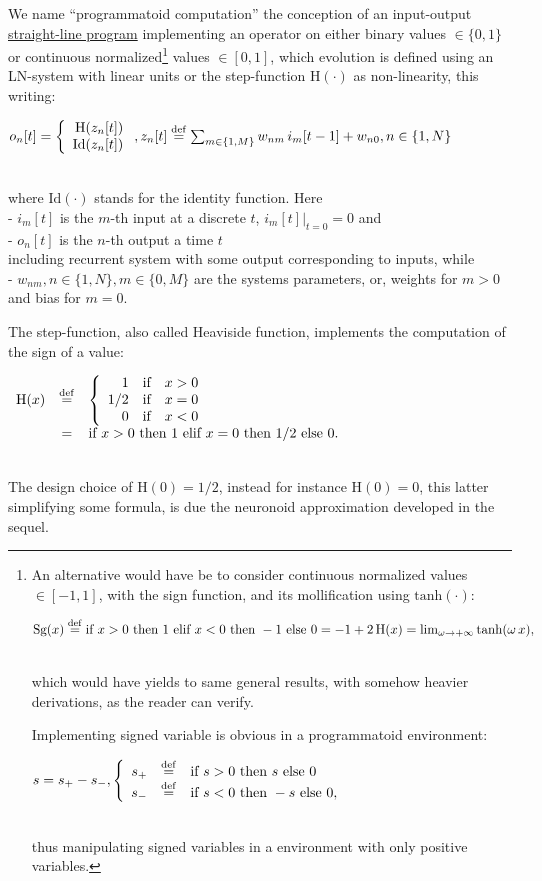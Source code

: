 \documentclass[a4]{article} \usepackage[left=2cm,right=3cm,top=1cm,bottom=2cm]{geometry}
\newcommand{\eqline}[1]{~\vspace{0.1cm}\\\centerline{$#1$}\vspace{0.1cm}\\}
\newcommand{\defq}{\stackrel {\rm def}{=}}
\newcommand{\tab}{\hphantom{4mm}}
\begin{document}
We name ``programmatoid computation'' the conception of an input-output \href{https://en.wikipedia.org/wiki/Straight-line_program}{straight-line program} implementing an operator on either binary values $\in \{0, 1\}$ or continuous normalized\footnote{An alternative would have be to consider continuous normalized values $\in [-1, 1]$, with the sign function, and its mollification using $\mbox{tanh}(\cdot)$:
\eqline{\mbox{Sg}(x) \defq \mbox{if } x > 0 \mbox{ then } 1 \mbox{ elif } x < 0 \mbox{ then } -1 \mbox{ else } 0 = -1 + 2 \, \mbox{H}(x) = \lim_{\omega \rightarrow +\infty} \mbox{tanh}(\omega \, x),}
which would have yields to same general results, with somehow heavier derivations, as the reader can verify.

Implementing signed variable is obvious in a programmatoid environment:
\eqline{s = s_+ - s_-, \left\{\begin{array}{rcl} s_+ &\defq& \mbox{if } s  > 0 \mbox{ then } s \mbox{ else } 0 \\ s_- &\defq& \mbox{if } s  < 0 \mbox{ then } -s \mbox{ else } 0, \\ \end{array} \right.}
thus manipulating signed variables in a environment with only positive variables.} values $\in [0, 1]$, which evolution is defined using an LN-system with linear units or the step-function $\mbox{H}(\cdot)$ as non-linearity, this writing:
\eqline{o_n[t] = \left\{ \begin{array}{r} \mbox{H}(z_n[t]) \\ \mbox{Id}(z_n[t]) \\ \end{array} \right., z_n[t] \defq \sum_{m\in\{1,M\}} w_{nm} \, i_m[t-1] + w_{n0}, n \in \{1, N\}}
where $\mbox{Id}(\cdot)$ stands for the identity function. Here
\\\tab - $i_m[t]$ is the $m$-th input at a discrete $t$, $\left. i_m[t] \right|_{t=0} = 0$ and
\\\tab - $o_n[t]$ is the $n$-th output a time $t$
\\ including recurrent system with some output corresponding to inputs, while
\\\tab - $w_{nm}, n \in \{1, N\}, m \in \{ 0, M \}$ are the systems parameters, or, weights for $m > 0$ and bias for $m = 0$.

The step-function, also called Heaviside function, implements the computation of the sign of a value:
\eqline{\begin{array}{rcl}
    \mbox{H}(x) &\defq& \left\{ \begin{array}{rcl} 1 &\mbox{if}& x > 0\\ 1/2 &\mbox{if}& x = 0\\ 0 &\mbox{if}& x < 0\\ \end{array}\right. \\
    &=& \mbox{if } x > 0 \mbox{ then } 1 \mbox{ elif } x = 0 \mbox{ then } 1/2 \mbox{ else } 0. \\
\end{array}}
The design choice of $\mbox{H}(0) = 1/2$, instead for instance $\mbox{H}(0)=0$, this latter simplifying some formula, is due the neuronoid approximation developed in the sequel.
\end{document}
